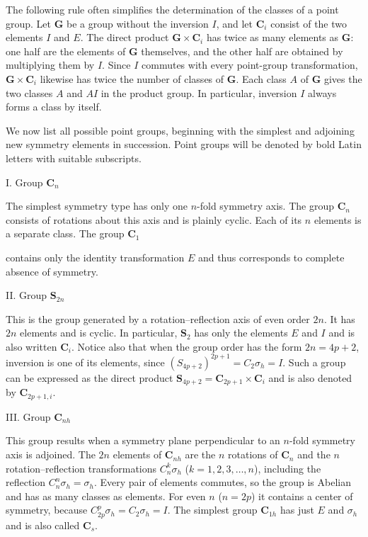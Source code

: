 The following rule often simplifies the determination of the classes of a point group. Let $\boldsymbol{G}$ be a group without the inversion $I$, and let $\boldsymbol{C}_i$ consist of the two elements $I$ and $E$. The direct product $\boldsymbol{G}\times\boldsymbol{C}_i$ has twice as many elements as $\boldsymbol{G}$: one half are the elements of $\boldsymbol{G}$ themselves, and the other half are obtained by multiplying them by $I$. Since $I$ commutes with every point-group transformation, $\boldsymbol{G}\times\boldsymbol{C}_i$ likewise has twice the number of classes of $\boldsymbol{G}$. Each class $A$ of $\boldsymbol{G}$ gives the two classes $A$ and $AI$ in the product group. In particular, inversion $I$ always forms a class by itself.

We now list all possible point groups, beginning with the simplest and adjoining new symmetry elements in succession. Point groups will be denoted by bold Latin letters with suitable subscripts.

\medskip
\noindent I. Group $\boldsymbol{C}_n$

The simplest symmetry type has only one $n$-fold symmetry axis. The group $\boldsymbol{C}_n$ consists of rotations about this axis and is plainly cyclic. Each of its $n$ elements is a separate class. The group $\boldsymbol{C}_1$

contains only the identity transformation $E$ and thus corresponds to complete absence of symmetry.

\medskip
\noindent II. Group $\boldsymbol{S}_{2n}$

This is the group generated by a rotation--reflection axis of even order $2n$. It has $2n$ elements and is cyclic. In particular, $\boldsymbol{S}_2$ has only the elements $E$ and $I$ and is also written $\boldsymbol{C}_i$. Notice also that when the group order has the form $2n=4p+2$, inversion is one of its elements, since $(S_{4p+2})^{2p+1}=C_2\sigma_h=I$. Such a group can be expressed as the direct product $\boldsymbol{S}_{4p+2}=\boldsymbol{C}_{2p+1}\times\boldsymbol{C}_i$ and is also denoted by $\boldsymbol{C}_{2p+1,i}$.

\medskip
\noindent III. Group $\boldsymbol{C}_{nh}$

This group results when a symmetry plane perpendicular to an $n$-fold symmetry axis is adjoined. The $2n$ elements of $\boldsymbol{C}_{nh}$ are the $n$ rotations of $\boldsymbol{C}_n$ and the $n$ rotation--reflection transformations $C_n^k\sigma_h$ ($k=1,2,3,\ldots,n$), including the reflection $C_n^n\sigma_h=\sigma_h$. Every pair of elements commutes, so the group is Abelian and has as many classes as elements. For even $n$ ($n=2p$) it contains a center of symmetry, because $C_{2p}^p\sigma_h=C_2\sigma_h=I$. The simplest group $\boldsymbol{C}_{1h}$ has just $E$ and $\sigma_h$ and is also called $\boldsymbol{C}_s$.

